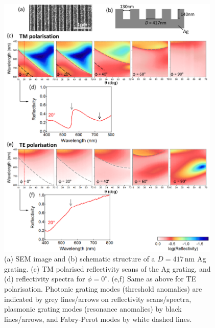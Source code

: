 \begin{figure}[h!] 
\centering    
\includegraphics[width=0.95\textwidth]{Fig8}
\caption[(a) SEM image and (b) schematic structure of $D=417$\,nm Ag grating. Reflectivity measurements of Ag grating in (c,d) TM and (e.f) TE polarisation.]{(a) SEM image and (b) schematic structure of a $D=417$\,nm Ag grating. (c) TM polarised reflectivity scans of the Ag grating, and (d) reflectivity spectra for $\phi=0^{\circ}$. (e,f) Same as above for TE polarisation. Photonic grating modes (threshold anomalies) are indicated by grey lines/arrows on reflectivity scans/spectra, plasmonic grating modes (resonance anomalies) by black lines/arrows, and Fabry-Perot modes by white dashed lines.}
\label{7Fig8}
\end{figure}

